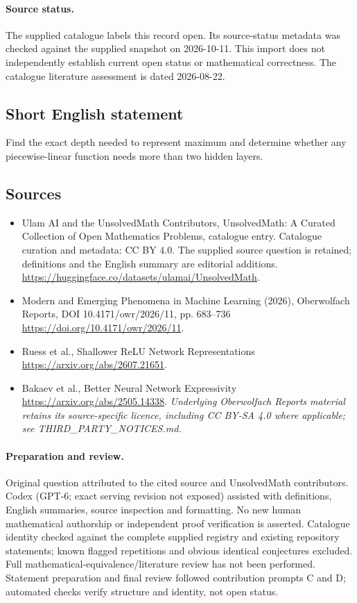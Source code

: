 \documentclass[11pt]{article}
\begin{document}
\paragraph{Source status.}
The supplied catalogue labels this record open. Its source-status metadata was checked against the supplied snapshot on 2026-10-11. This import does not independently establish current open status or mathematical correctness. The catalogue literature assessment is dated 2026-08-22.
\subsection{Short English statement}
Find the exact depth needed to represent maximum and determine whether any piecewise-linear function needs more than two hidden layers.
\subsection{Sources}
\begin{itemize}
\item[\hypertarget{source:statement:1}{S1}] Ulam AI and the UnsolvedMath Contributors, UnsolvedMath: A Curated Collection of Open Mathematics Problems, catalogue entry. Catalogue curation and metadata: CC BY 4.0. The supplied source question is retained; definitions and the English summary are editorial additions.
\url{https://huggingface.co/datasets/ulamai/UnsolvedMath}.
\item[\hypertarget{source:statement:2}{S2}] Modern and Emerging Phenomena in Machine Learning (2026), Oberwolfach Reports, DOI 10.4171/owr/2026/11, pp. 683--736
\url{https://doi.org/10.4171/owr/2026/11}.
\item[\hypertarget{source:statement:3}{S3}] Ruess et al., Shallower ReLU Network Representations
\url{https://arxiv.org/abs/2607.21651}.
\item[\hypertarget{source:statement:4}{S4}] Bakaev et al., Better Neural Network Expressivity
\url{https://arxiv.org/abs/2505.14338}.
\textit{Underlying Oberwolfach Reports material retains its source-specific licence, including CC BY-SA 4.0 where applicable; see THIRD\_PARTY\_NOTICES.md.}
\end{itemize}
\paragraph{Preparation and review.}
Original question attributed to the cited source and UnsolvedMath contributors. Codex (GPT-6; exact serving revision not exposed) assisted with definitions, English summaries, source inspection and formatting. No new human mathematical authorship or independent proof verification is asserted. Catalogue identity checked against the complete supplied registry and existing repository statements; known flagged repetitions and obvious identical conjectures excluded. Full mathematical-equivalence/literature review has not been performed. Statement preparation and final review followed contribution prompts C and D; automated checks verify structure and identity, not open status.
\label{end:statement}
\end{document}
